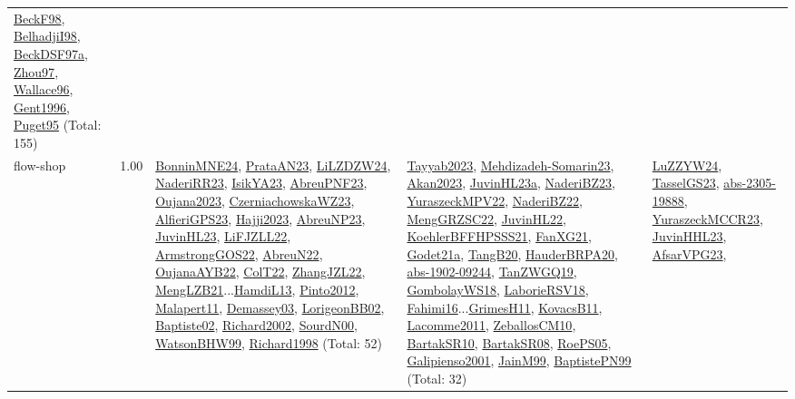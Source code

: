 {\begin{longtable}{p{3cm}r>{\raggedright\arraybackslash}p{6cm}>{\raggedright\arraybackslash}p{6cm}>{\raggedright\arraybackslash}p{8cm}}
\hyperref[detail:BeckF98]{BeckF98}, \hyperref[detail:BelhadjiI98]{BelhadjiI98}, \hyperref[detail:BeckDSF97a]{BeckDSF97a}, \hyperref[detail:Zhou97]{Zhou97}, \hyperref[detail:Wallace96]{Wallace96}, \hyperref[detail:Gent1996]{Gent1996}, \hyperref[detail:Puget95]{Puget95} (Total: 155)\\
\index{flow-shop}\index{Concepts!flow-shop}flow-shop &  1.00 & \hyperref[detail:BonninMNE24]{BonninMNE24}, \hyperref[detail:PrataAN23]{PrataAN23}, \hyperref[detail:LiLZDZW24]{LiLZDZW24}, \hyperref[detail:NaderiRR23]{NaderiRR23}, \hyperref[detail:IsikYA23]{IsikYA23}, \hyperref[detail:AbreuPNF23]{AbreuPNF23}, \hyperref[detail:Oujana2023]{Oujana2023}, \hyperref[detail:CzerniachowskaWZ23]{CzerniachowskaWZ23}, \hyperref[detail:AlfieriGPS23]{AlfieriGPS23}, \hyperref[detail:Hajji2023]{Hajji2023}, \hyperref[detail:AbreuNP23]{AbreuNP23}, \hyperref[detail:JuvinHL23]{JuvinHL23}, \hyperref[detail:LiFJZLL22]{LiFJZLL22}, \hyperref[detail:ArmstrongGOS22]{ArmstrongGOS22}, \hyperref[detail:AbreuN22]{AbreuN22}, \hyperref[detail:OujanaAYB22]{OujanaAYB22}, \hyperref[detail:ColT22]{ColT22}, \hyperref[detail:ZhangJZL22]{ZhangJZL22}, \hyperref[detail:MengLZB21]{MengLZB21}...\hyperref[detail:HamdiL13]{HamdiL13}, \hyperref[detail:Pinto2012]{Pinto2012}, \hyperref[detail:Malapert11]{Malapert11}, \hyperref[detail:Demassey03]{Demassey03}, \hyperref[detail:LorigeonBB02]{LorigeonBB02}, \hyperref[detail:Baptiste02]{Baptiste02}, \hyperref[detail:Richard2002]{Richard2002}, \hyperref[detail:SourdN00]{SourdN00}, \hyperref[detail:WatsonBHW99]{WatsonBHW99}, \hyperref[detail:Richard1998]{Richard1998} (Total: 52) & \hyperref[detail:Tayyab2023]{Tayyab2023}, \hyperref[detail:Mehdizadeh-Somarin23]{Mehdizadeh-Somarin23}, \hyperref[detail:Akan2023]{Akan2023}, \hyperref[detail:JuvinHL23a]{JuvinHL23a}, \hyperref[detail:NaderiBZ23]{NaderiBZ23}, \hyperref[detail:YuraszeckMPV22]{YuraszeckMPV22}, \hyperref[detail:NaderiBZ22]{NaderiBZ22}, \hyperref[detail:MengGRZSC22]{MengGRZSC22}, \hyperref[detail:JuvinHL22]{JuvinHL22}, \hyperref[detail:KoehlerBFFHPSSS21]{KoehlerBFFHPSSS21}, \hyperref[detail:FanXG21]{FanXG21}, \hyperref[detail:Godet21a]{Godet21a}, \hyperref[detail:TangB20]{TangB20}, \hyperref[detail:HauderBRPA20]{HauderBRPA20}, \hyperref[detail:abs-1902-09244]{abs-1902-09244}, \hyperref[detail:TanZWGQ19]{TanZWGQ19}, \hyperref[detail:GombolayWS18]{GombolayWS18}, \hyperref[detail:LaborieRSV18]{LaborieRSV18}, \hyperref[detail:Fahimi16]{Fahimi16}...\hyperref[detail:GrimesH11]{GrimesH11}, \hyperref[detail:KovacsB11]{KovacsB11}, \hyperref[detail:Lacomme2011]{Lacomme2011}, \hyperref[detail:ZeballosCM10]{ZeballosCM10}, \hyperref[detail:BartakSR10]{BartakSR10}, \hyperref[detail:BartakSR08]{BartakSR08}, \hyperref[detail:RoePS05]{RoePS05}, \hyperref[detail:Galipienso2001]{Galipienso2001}, \hyperref[detail:JainM99]{JainM99}, \hyperref[detail:BaptistePN99]{BaptistePN99} (Total: 32) & \hyperref[detail:LuZZYW24]{LuZZYW24}, \hyperref[detail:TasselGS23]{TasselGS23}, \hyperref[detail:abs-2305-19888]{abs-2305-19888}, \hyperref[detail:YuraszeckMCCR23]{YuraszeckMCCR23}, \hyperref[detail:JuvinHHL23]{JuvinHHL23}, \hyperref[detail:AfsarVPG23]{AfsarVPG23}, 
\end{longtable}}

